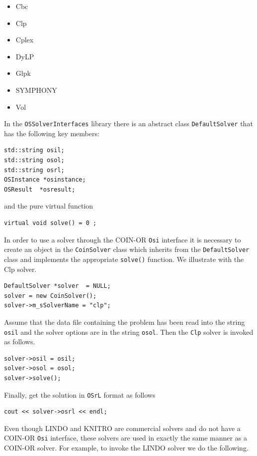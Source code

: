 \documentclass[11pt]{article}
\renewcommand{\_}{{\char"5F}}
\renewcommand{\{}{{\char"7B}}
\renewcommand{\}}{{\char"7D}}
\renewcommand{\^}{{\char"0D}}
\renewcommand{\'}{{\char"0D}}
\newif\ifknitro \knitrofalse    %
\begin{document}
\begin{enumerate}[Step 1:]
\begin{itemize}
\item Cbc
\item Clp
\item Cplex
\item DyLP
\item Glpk
\item SYMPHONY
\item Vol
\end{itemize}

In the {\tt OSSolverInterfaces} library there is an abstract class {\tt DefaultSolver} that has the following key members:

\begin{verbatim}
std::string osil;
std::string osol;
std::string osrl;
OSInstance *osinstance;
OSResult  *osresult;
\end{verbatim}
and the pure virtual function
\begin{verbatim}
virtual void solve() = 0 ;
\end{verbatim}
In order to use a solver through the COIN-OR {\tt Osi} interface it is necessary to create an object in the {\tt CoinSolver} class which inherits from the {\tt DefaultSolver} class and implements the appropriate {\tt solve()} function.  We illustrate with the Clp solver.

\begin{verbatim}
DefaultSolver *solver  = NULL;
solver = new CoinSolver();
solver->m_sSolverName = "clp";
\end{verbatim}

Assume that the data file containing the problem has been read into the string {\tt osil} and the solver options are in the string {\tt osol}. Then the {\tt Clp} solver is invoked as follows.

\begin{verbatim}
solver->osil = osil;
solver->osol = osol;
solver->solve();
\end{verbatim}

Finally, get the solution in {\tt OSrL} format as follows

\begin{verbatim}
cout << solver->osrl << endl;
\end{verbatim}

\ifknitro   %
Even though LINDO and KNITRO are commercial solvers and do not have a COIN-OR {\tt Osi} interface, these solvers are 
used in exactly the same manner as a COIN-OR solver. For example, to invoke the LINDO solver we do the following.


\end{enumerate}
\end{document}
